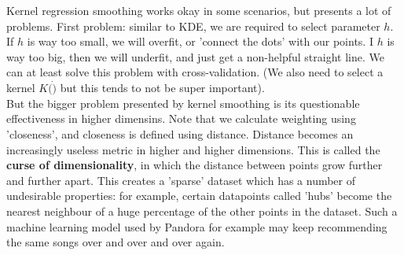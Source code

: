 \documentclass[12pt]{article}
\begin{document}
Kernel regression smoothing works okay in some scenarios, but presents a lot of problems. First problem: similar to KDE, we are required to select parameter $h$. If $h$ is way too small, we will overfit, or 'connect the dots' with our points. I $h$ is way too big, then we will underfit, and just get a non-helpful straight line. We can at least solve this problem with cross-validation. (We also need to select a kernel $K(\dot)$ but this tends to not be super important).\\

But the bigger problem presented by kernel smoothing is its questionable effectiveness in higher dimensins. Note that we calculate weighting using 'closeness', and closeness is defined using distance. Distance becomes an increasingly useless metric in higher and higher dimensions. This is called the \textbf{curse of dimensionality}, in which the distance between points grow further and further apart. This creates a 'sparse' dataset which has a number of undesirable properties: for example, certain datapoints called 'hubs' become the nearest neighbour of a huge percentage of the other points in the dataset. Such a machine learning model used by Pandora for example may keep recommending the same songs over and over and over again. \\
\end{document}
